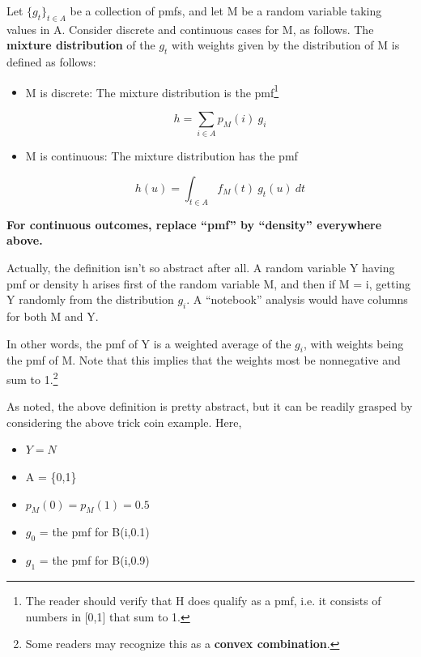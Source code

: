 \documentclass[11pt]{article}
\begin{document}
\begin{definition} Let $\{g_t\}_{t \in A}$ be a collection of pmfs, and
let M be a random variable taking values in A.  Consider discrete and
continuous cases for M, as follows.  The {\bf mixture distribution} of
the $g_t$ with weights given by the distribution of M is defined as
follows:

\begin{itemize}

\item M is discrete:  The mixture distribution is the pmf\footnote{The
reader should verify that H does qualify as a pmf, i.e. it consists of
numbers in [0,1] that sum to 1.}

\begin{equation}
\label{hsum}
h = \sum_{i \in A} p_M(i) ~ g_i
\end{equation}

\item M is continuous:  The mixture distribution has the pmf 

\begin{equation}
\label{continmix}
h(u) = \int_{t \in A} f_M(t)~  g_t(u) ~ dt
\end{equation}

\end{itemize}

{\bf For continuous outcomes, replace ``pmf'' by ``density'' everywhere
above.}

\end{definition}

\vskip 0.5in

Actually, the definition isn't so abstract after all.  A random variable
Y having pmf or density h arises first of the random variable M, and then if M
= i, getting Y randomly from the distribution $g_i$.  A ``notebook''
analysis would have columns for both M and Y.

In other words, the pmf of Y is a weighted average of the $g_i$, with
weights being the pmf of M.  Note that this implies that the weights
most be nonnegative and sum to 1.\footnote{Some readers may recognize
this as a {\bf convex combination}.}

As noted, the above definition is pretty abstract, but it can be readily
grasped by considering the above trick coin example.  Here,

\begin{itemize}

\item $Y = N$

\item A = \{0,1\}

\item $p_M(0) = p_M(1) = 0.5$

\item $g_0$ = the pmf for B(i,0.1)

\item $g_1$ = the pmf for B(i,0.9)

\end{itemize}
\end{document}
